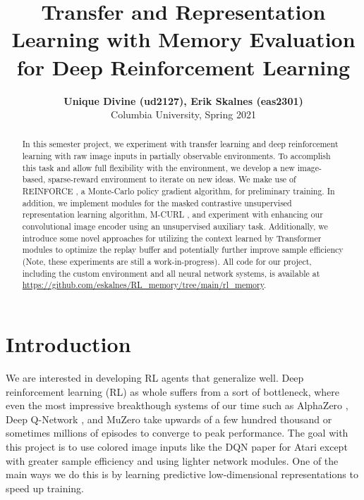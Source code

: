 \documentclass[11pt]{article}
\title{\textbf{Transfer and Representation Learning with Memory Evaluation for Deep Reinforcement Learning}}
\author{
    \normalsize \textbf{Unique Divine (ud2127), Erik Skalnes (eas2301)} \\
    \normalsize Columbia University, Spring 2021 \\
}
\date{}
\begin{document}
\maketitle
\thispagestyle{fancy}


\begin{abstract}
In this semester project, we experiment with transfer learning and deep reinforcement learning with raw image inputs in partially observable environments. To accomplish this task and allow full flexibility with the environment, we develop a new image-based, sparse-reward environment to iterate on new ideas. We make use of REINFORCE \cite{williams1992simple}, a Monte-Carlo policy gradient algorithm, for preliminary  training. In addition, we implement modules for the masked contrastive unsupervised representation learning algorithm, M-CURL \cite{zhu2020masked}, and experiment with enhancing our convolutional image encoder using an unsupervised auxiliary task. Additionally, we introduce some novel approaches for utilizing the context learned by Transformer modules to optimize the replay buffer and potentially further improve sample efficiency (Note, these experiments are still a work-in-progress). All code for our project, including the custom environment and all neural network systems, is available at \url{https://github.com/eskalnes/RL_memory/tree/main/rl_memory}.  
\end{abstract}

\section{Introduction}

We are interested in developing RL agents that generalize well. Deep reinforcement learning (RL) as whole suffers from a sort of bottleneck, where even the most impressive breakthough systems of our time such as AlphaZero \cite{silver2017mastering}, Deep Q-Network \cite{mnih2015human}, and MuZero \cite{schrittwieser2020mastering} take upwards of a few hundred thousand or sometimes millions of episodes to converge to peak performance. The goal with this project is to use colored image inputs like the DQN paper for Atari except with greater sample efficiency and using lighter network modules. One of the main ways we do this is by learning predictive low-dimensional representations to speed up training. 
\end{document}
